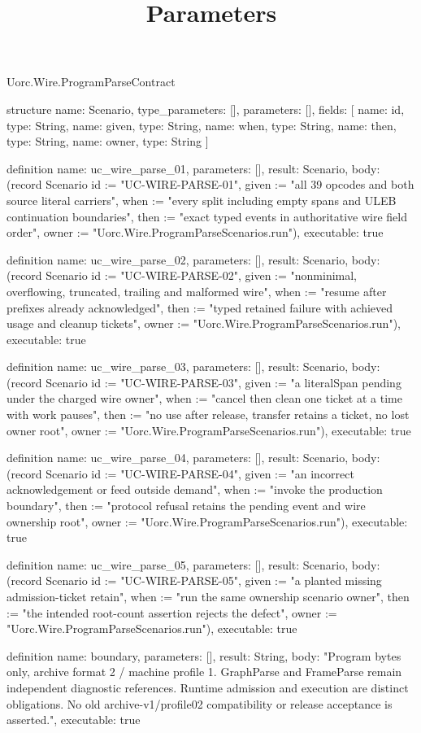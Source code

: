 \begin{lexlean}{Uorc.Wire.ProgramParseContract}
\title{Parameters}
\begin{semanticmodule}
structure{
  name: Scenario,
  type_parameters: [],
  parameters: [],
  fields: [
    {name: id, type: String},
    {name: given, type: String},
    {name: when, type: String},
    {name: then, type: String},
    {name: owner, type: String}
  ]
}

definition{
  name: uc_wire_parse_01,
  parameters: [],
  result: Scenario,
  body: (record Scenario {id := "UC-WIRE-PARSE-01", given := "all 39 opcodes and both source literal carriers", when := "every split including empty spans and ULEB continuation boundaries", then := "exact typed events in authoritative wire field order", owner := "Uorc.Wire.ProgramParseScenarios.run"}),
  executable: true
}

definition{
  name: uc_wire_parse_02,
  parameters: [],
  result: Scenario,
  body: (record Scenario {id := "UC-WIRE-PARSE-02", given := "nonminimal, overflowing, truncated, trailing and malformed wire", when := "resume after prefixes already acknowledged", then := "typed retained failure with achieved usage and cleanup tickets", owner := "Uorc.Wire.ProgramParseScenarios.run"}),
  executable: true
}

definition{
  name: uc_wire_parse_03,
  parameters: [],
  result: Scenario,
  body: (record Scenario {id := "UC-WIRE-PARSE-03", given := "a literalSpan pending under the charged wire owner", when := "cancel then clean one ticket at a time with work pauses", then := "no use after release, transfer retains a ticket, no lost owner root", owner := "Uorc.Wire.ProgramParseScenarios.run"}),
  executable: true
}

definition{
  name: uc_wire_parse_04,
  parameters: [],
  result: Scenario,
  body: (record Scenario {id := "UC-WIRE-PARSE-04", given := "an incorrect acknowledgement or feed outside demand", when := "invoke the production boundary", then := "protocol refusal retains the pending event and wire ownership root", owner := "Uorc.Wire.ProgramParseScenarios.run"}),
  executable: true
}

definition{
  name: uc_wire_parse_05,
  parameters: [],
  result: Scenario,
  body: (record Scenario {id := "UC-WIRE-PARSE-05", given := "a planted missing admission-ticket retain", when := "run the same ownership scenario owner", then := "the intended root-count assertion rejects the defect", owner := "Uorc.Wire.ProgramParseScenarios.run"}),
  executable: true
}

definition{
  name: boundary,
  parameters: [],
  result: String,
  body: "Program bytes only, archive format 2 / machine profile 1. GraphParse and FrameParse remain independent diagnostic references. Runtime admission and execution are distinct obligations. No old archive-v1/profile02 compatibility or release acceptance is asserted.",
  executable: true
}
\end{semanticmodule}
\end{lexlean}
